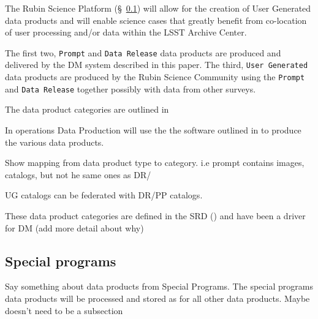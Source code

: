 The Rubin Science Platform (\S~\ref{}) will allow for the creation of User Generated data
products and will enable science cases that greatly benefit from co-location of
user processing and/or data within the LSST Archive Center.

%



The first two, {\tt Prompt} and {\tt Data Release} data products are produced and delivered by the DM system described in this paper.
The third, {\tt User Generated} data products are produced by the Rubin Science Community using the {\tt Prompt} and {\tt Data Release} together possibly with data from other surveys.

The data product categories are outlined in \citet{LPM-231}

In operations Data Production will use the the software outlined in  to produce the various data products.

Show mapping from data product type to category. i.e prompt contains images, catalogs, but not he same ones as DR/

UG catalogs can be federated with DR/PP catalogs.

These data product categories are defined in the SRD (\citep{LPM-17}) and have been a driver for DM
(add more detail about why)

\subsection{Special programs}
Say something about data products from Special Programs.
The special programs data products will be processed and stored as for all other data products.
Maybe doesn't need to be a subsection

